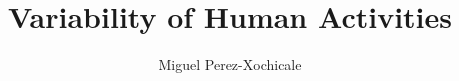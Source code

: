\documentclass[10pt,journal,compsoc]{IEEEtran}
\begin{document}
%
\title{Variability of Human Activities}
%
%
%
%

\author{Miguel Perez-Xochicale
}
\end{document}
